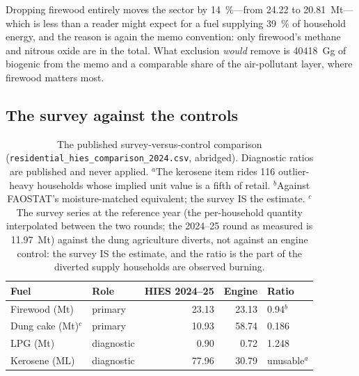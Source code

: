 Dropping firewood entirely moves the sector by \SI{14}{\percent}---from \SI{24.22}{} to
\SI{20.81}{\mega\tonne}---which is less than a reader might expect for a fuel supplying
\SI{39}{\percent} of household energy, and the reason is again the memo convention: only
firewood's methane and nitrous oxide are in the total. What exclusion \emph{would} remove is
\SI{40418}{\giga\gram} of biogenic \COtwo{} from the memo and a comparable share of the
air-pollutant layer, where firewood matters most.

\subsection{The survey against the controls}

\begin{table}[htbp]
\centering
\footnotesize
\begin{tabular}{@{}llrrl@{}}
\toprule
\textbf{Fuel} & \textbf{Role} & \textbf{HIES 2024--25} & \textbf{Engine} & \textbf{Ratio} \\
\midrule
Firewood (Mt)   & primary     & 23.13 & 23.13 & 0.94$^b$ \\
Dung cake (Mt)$^c$ & primary  & 10.93 & 58.74 & 0.186 \\
LPG (Mt)        & diagnostic  &  0.90 &  0.72 & 1.248 \\
Kerosene (ML)   & diagnostic  & 77.96 & 30.79 & unusable$^a$ \\
\bottomrule
\end{tabular}
\caption{The published survey-versus-control comparison
(\texttt{residential\_hies\_comparison\_2024.csv}, abridged). Diagnostic ratios are
published and never applied. $^a$The kerosene item rides 116 outlier-heavy households
whose implied unit value is a fifth of retail. $^b$Against FAOSTAT's moisture-matched
equivalent; the survey IS the estimate. $^c$The survey series at the reference year (the
per-household quantity interpolated between the two rounds; the 2024--25 round as
measured is \SI{11.97}{\mega\tonne}) against the dung agriculture diverts, not against
an engine control: the survey IS the estimate, and the ratio is the part of the diverted
supply households are observed burning.}
\label{tab:hies}
\end{table}


